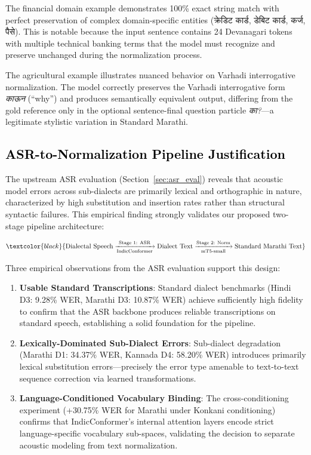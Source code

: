 The financial domain example demonstrates 100\% exact string match with perfect preservation of complex domain-specific entities (क्रेडिट कार्ड, डेबिट कार्ड, कर्ज, पैसे). This is notable because the input sentence contains 24 Devanagari tokens with multiple technical banking terms that the model must recognize and preserve unchanged during the normalization process.

The agricultural example illustrates nuanced behavior on Varhadi interrogative normalization. The model correctly preserves the Varhadi interrogative form \emph{काऊन} (``why'') and produces semantically equivalent output, differing from the gold reference only in the optional sentence-final question particle \emph{का?}---a legitimate stylistic variation in Standard Marathi.

\subsection{\textcolor{black}{ASR-to-Normalization Pipeline Justification}}

The upstream ASR evaluation (Section~\ref{sec:asr_eval}) reveals that acoustic model errors across sub-dialects are primarily lexical and orthographic in nature, characterized by high substitution and insertion rates rather than structural syntactic failures. This empirical finding strongly validates our proposed two-stage pipeline architecture:

\begin{equation}
\textcolor{black}{\text{Dialectal Speech} \xrightarrow[\text{IndicConformer}]{\text{Stage 1: ASR}} \text{Dialect Text} \xrightarrow[\text{mT5-small}]{\text{Stage 2: Norm}} \text{Standard Marathi Text}}
\end{equation}

Three empirical observations from the ASR evaluation support this design:

\begin{enumerate}
    \item \textbf{Usable Standard Transcriptions}: Standard dialect benchmarks (Hindi D3: 9.28\% WER, Marathi D3: 10.87\% WER) achieve sufficiently high fidelity to confirm that the ASR backbone produces reliable transcriptions on standard speech, establishing a solid foundation for the pipeline.
    \item \textbf{Lexically-Dominated Sub-Dialect Errors}: Sub-dialect degradation (Marathi D1: 34.37\% WER, Kannada D4: 58.20\% WER) introduces primarily lexical substitution errors---precisely the error type amenable to text-to-text sequence correction via learned transformations.
    \item \textbf{Language-Conditioned Vocabulary Binding}: The cross-conditioning experiment (+30.75\% WER for Marathi under Konkani conditioning) confirms that IndicConformer's internal attention layers encode strict language-specific vocabulary sub-spaces, validating the decision to separate acoustic modeling from text normalization.
\end{enumerate}

